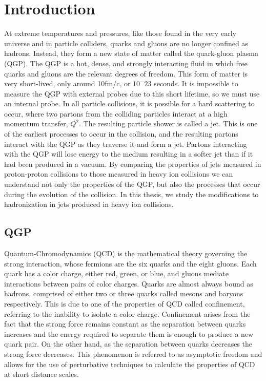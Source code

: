 \chapter{Introduction} \label{ch:introduction}

At extreme temperatures and pressures, like those found in the very early universe and in particle colliders, quarks and gluons are no longer confined as hadrons. Instead, they form a new state of matter called the quark-gluon plasma (QGP). The QGP is a hot, dense, and strongly interacting fluid in which free quarks and gluons are the relevant degrees of freedom. This form of matter is very short-lived, only around 10fm/c, or $10^-23$ seconds. It is impossible to measure the QGP with external probes due to this short lifetime, so we must use an internal probe. In all particle collisions, it is possible for a hard scattering to occur, where two partons from the colliding particles interact at a high momentum transfer, $Q^2$. The resulting particle shower is called a jet. This is one of the earliest processes to occur in the collision, and the resulting partons interact with the QGP as they traverse it and form a jet. Partons interacting with the QGP will lose energy to the medium resulting in a softer jet than if it had been produced in a vacuum. By comparing the properties of jets measured in proton-proton collisions to those measured in heavy ion collisions we can understand not only the properties of the QGP, but also the processes that occur during the evolution of the collision. In this thesis, we study the modifications to hadronization in jets produced in heavy ion collisions.

\section{QGP}

Quantum-Chromodynamics (QCD) is the mathematical theory governing the strong interaction, whose fermions are the six quarks and the eight gluons. Each quark has a color charge, either red, green, or blue, and gluons mediate interactions between pairs of color charges. Quarks are almost always bound as hadrons, comprised of either two or three quarks called mesons and baryons respectively. This is due to one of the properties of QCD called confinement, referring to the inability to isolate a color charge. Confinement arises from the fact that the strong force remains constant as the separation between quarks increases and the energy required to separate them is enough to produce a new quark pair. On the other hand, as the separation between quarks decreases the strong force decreases. This phenomenon is referred to as asymptotic freedom and allows for the use of perturbative techniques to calculate the properties of QCD at short distance scales. 

